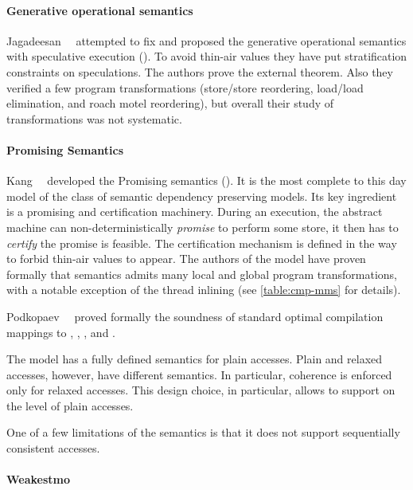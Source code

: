 \paragraph{Generative operational semantics}

Jagadeesan~\etal~\cite{Jagadeesan-al:ESOP10} attempted to fix \JMM 
and proposed the generative operational semantics 
with speculative execution (\GOS).
To avoid thin-air values they have put stratification constraints 
on speculations. The authors prove the external \DRF theorem. 
Also they verified a few program transformations 
(store/store reordering, load/load elimination, and roach motel reordering), 
but overall their study of transformations was not systematic.  

\paragraph{Promising Semantics}

Kang~\etal~\cite{Kang-al:POPL17, Lee-al:PLDI20} developed 
the Promising semantics (\PRM).
It is the most complete to this day model of the class of
semantic dependency preserving models. 
Its key ingredient is a promising and certification machinery.
During an execution, the abstract machine can 
non-deterministically \emph{promise} to perform some store,
it then has to \emph{certify} the promise is feasible. 
The certification mechanism is defined in the way to forbid thin-air values to appear.
The authors of the model have proven formally 
that \Promising semantics admits many local and global program transformations,
with a notable exception of the thread inlining
(see \cref{table:cmp-mms} for details).

Podkopaev~\etal~\cite{Podkopaev-al:ECOOP17, Podkopaev-al:POPL19} 
proved formally the soundness of standard optimal 
compilation mappings to \Intel, , , and \POWER.

The model has a fully defined semantics for plain accesses.  
Plain and relaxed accesses, however, have different semantics.
In particular, coherence is enforced only for relaxed accesses. 
This design choice, in particular, allows to support 
\CSE on the level of plain accesses. 

One of a few limitations of the \Promising semantics is that 
it does not support sequentially consistent accesses. 

\paragraph{Weakestmo}

